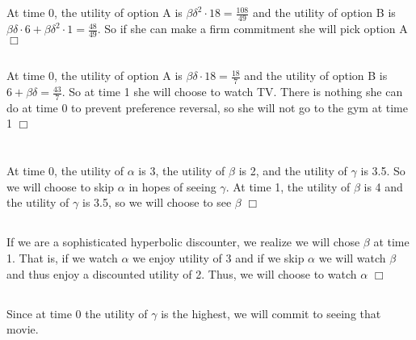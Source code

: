 \documentclass{article}
\begin{document}
\section{}
\subsection{}
At time 0, the utility of option A is $\beta \delta^2 \cdot 18 = \tfrac{108}{49}$ and the utility of option B is $\beta \delta \cdot 6 + \beta \delta^2 \cdot 1 = \tfrac{48}{49}$. So if she can make a firm commitment she will pick option A $\Box$

\subsection{}
At time 0, the utility of option A is $\beta \delta \cdot 18 = \tfrac{18}{7}$ and the utility of option B is $6 + \beta \delta = \tfrac{43}{7}$. So at time 1 she will choose to watch TV. There is nothing she can do at time 0 to prevent preference reversal, so she will not go to the gym at time 1 $\Box$

\section{}
\subsection{}
At time 0, the utility of $\alpha$ is 3, the utility of $\beta$ is 2, and the utility of $\gamma$ is 3.5. So we will choose to skip $\alpha$ in hopes of seeing $\gamma$. At time 1, the utility of $\beta$ is 4 and the utility of $\gamma$ is 3.5, so we will choose to see $\beta$ $\Box$

\subsection{}
If we are a sophisticated hyperbolic discounter, we realize we will chose $\beta$ at time 1. That is, if we watch $\alpha$ we enjoy utility of 3 and if we skip $\alpha$ we will watch $\beta$ and thus enjoy a discounted utility of 2. Thus, we will choose to watch $\alpha$ $\Box$

\subsection{}
Since at time 0 the utility of $\gamma$ is the highest, we will commit to seeing that movie.
\end{document}
